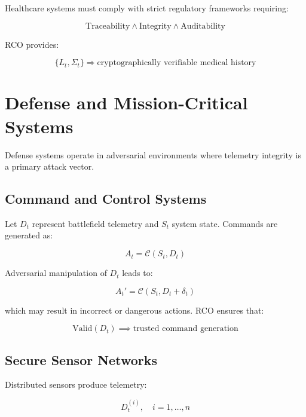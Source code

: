 Healthcare systems must comply with strict regulatory frameworks requiring:

\begin{equation}
\text{Traceability} \land \text{Integrity} \land \text{Auditability}
\end{equation}

RCO provides:

\begin{equation}
\{L_t, \Sigma_t\} \Rightarrow \text{cryptographically verifiable medical history}
\end{equation}

\section{Defense and Mission-Critical Systems}

Defense systems operate in adversarial environments where telemetry integrity is a primary attack vector.

\subsection{Command and Control Systems}

Let $D_t$ represent battlefield telemetry and $S_t$ system state. Commands are generated as:

\begin{equation}
A_t = \mathcal{C}(S_t, D_t)
\end{equation}

Adversarial manipulation of $D_t$ leads to:

\begin{equation}
A_t' = \mathcal{C}(S_t, D_t + \delta_t)
\end{equation}

which may result in incorrect or dangerous actions. RCO ensures that:

\begin{equation}
\text{Valid}(D_t) \implies \text{trusted command generation}
\end{equation}

\subsection{Secure Sensor Networks}

Distributed sensors produce telemetry:

\begin{equation}
D_t^{(i)}, \quad i = 1, \dots, n
\end{equation}

